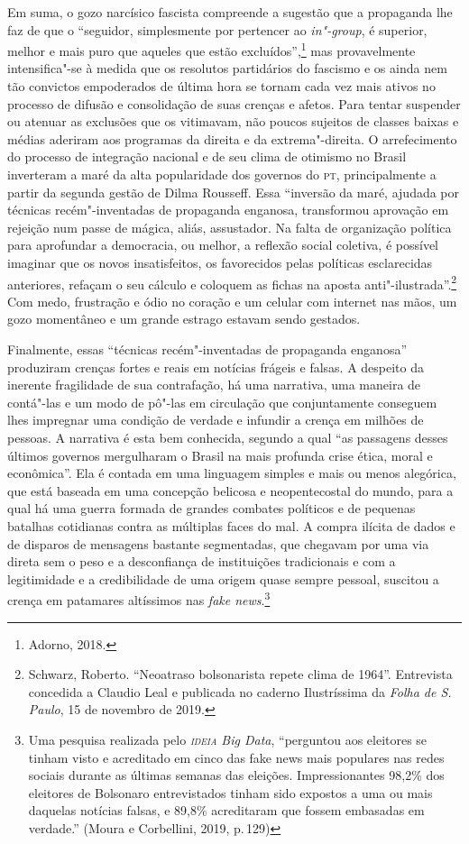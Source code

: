 Em suma, o gozo narcísico fascista compreende a sugestão que a
propaganda lhe faz de que o ``seguidor, simplesmente por pertencer ao
\emph{in"-group}, é superior, melhor e mais puro que aqueles que estão
excluídos'',\footnote{Adorno, 2018.} mas provavelmente intensifica"-se à
medida que os resolutos partidários do fascismo e os ainda nem tão
convictos empoderados de última hora se tornam cada vez mais ativos no
processo de difusão e consolidação de suas crenças e afetos. Para tentar
suspender ou atenuar as exclusões que os vitimavam, não poucos sujeitos
de classes baixas e médias aderiram aos programas da direita e da
extrema"-direita. O arrefecimento do processo de integração nacional e de
seu clima de otimismo no Brasil inverteram a maré da alta popularidade
dos governos do \textsc{pt}, principalmente a partir da segunda gestão de Dilma
Rousseff. Essa ``inversão da maré, ajudada por técnicas recém"-inventadas
de propaganda enganosa, transformou aprovação em rejeição num passe de
mágica, aliás, assustador. Na falta de organização política para
aprofundar a democracia, ou melhor, a reflexão social coletiva, é
possível imaginar que os novos insatisfeitos, os favorecidos pelas
políticas esclarecidas anteriores, refaçam o seu cálculo e coloquem as
fichas na aposta anti"-ilustrada''.\footnote{Schwarz, Roberto. ``Neoatraso
  bolsonarista repete clima de 1964''. Entrevista concedida a Claudio
  Leal e publicada no caderno Ilustríssima da \emph{Folha de S.\,Paulo},
  15 de novembro de 2019.} Com medo, frustração e ódio no coração e um
celular com internet nas mãos, um gozo momentâneo e um grande estrago
estavam sendo gestados.

Finalmente, essas ``técnicas recém"-inventadas de propaganda enganosa''
produziram crenças fortes e reais em notícias frágeis e falsas. A
despeito da inerente fragilidade de sua contrafação, há uma narrativa,
uma maneira de contá"-las e um modo de pô"-las em circulação que
conjuntamente conseguem lhes impregnar uma condição de verdade e
infundir a crença em milhões de pessoas. A narrativa é esta bem
conhecida, segundo a qual ``as passagens desses últimos governos
mergulharam o Brasil na mais profunda crise ética, moral e econômica''.
Ela é contada em uma linguagem simples e mais ou menos alegórica, que
está baseada em uma concepção belicosa e neopentecostal do mundo, para a
qual há uma guerra formada de grandes combates políticos e de pequenas
batalhas cotidianas contra as múltiplas faces do mal. A compra ilícita
de dados e de disparos de mensagens bastante segmentadas, que chegavam
por uma via direta sem o peso e a desconfiança de instituições
tradicionais e com a legitimidade e a credibilidade de uma origem quase
sempre pessoal, suscitou a crença em patamares altíssimos nas \emph{fake
news}.\footnote{Uma pesquisa realizada pelo \emph{\textsc{ideia} Big Data},
  ``perguntou aos eleitores se tinham visto e acreditado em cinco das
  fake news mais populares nas redes sociais durante as últimas semanas
  das eleições. Impressionantes 98,2\% dos eleitores de Bolsonaro
  entrevistados tinham sido expostos a uma ou mais daquelas notícias
  falsas, e 89,8\% acreditaram que fossem embasadas em verdade.'' (Moura
  e Corbellini, 2019, p.\,129)}

